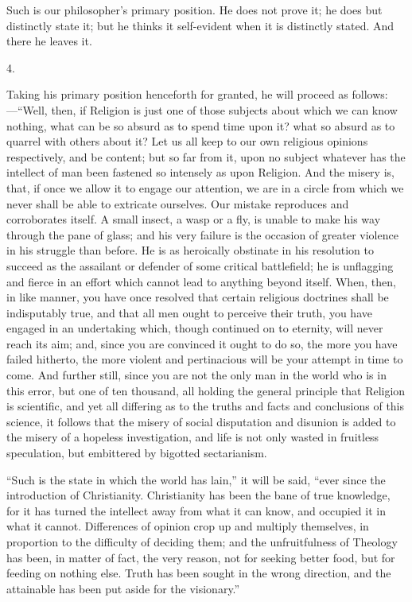 Such is our philosopher's primary position. He does not prove it;
he does but distinctly state it; but he thinks it self-evident when it
is distinctly stated. And there he leaves it.

4.

Taking his primary position henceforth for granted, he will proceed
as follows:—``Well, then, if Religion is just one of those
subjects about which we can know nothing, what can be so absurd as to
spend time upon it? what so absurd as to quarrel with others about it?
Let us all keep to our own religious opinions respectively, and be
content; but so far from it, upon no subject whatever has the
intellect of man been fastened so intensely as upon Religion. And the
misery is, that, if once we allow it to engage our attention, we are
in a circle from which we never shall be able to extricate ourselves. Our mistake reproduces and corroborates itself. A small
insect, a wasp or a fly, is unable to make his way through the pane of
glass; and his very failure is the occasion of greater violence in his
struggle than before. He is as heroically obstinate in his resolution
to succeed as the assailant or defender of some critical battlefield;
he is unflagging and fierce in an effort which cannot lead to anything
beyond itself. When, then, in like manner, you have once resolved that
certain religious doctrines shall be indisputably true, and that all
men ought to perceive their truth, you have engaged in an undertaking
which, though continued on to eternity, will never reach its aim; and,
since you are convinced it ought to do so, the more you have failed
hitherto, the more violent and pertinacious will be your attempt in
time to come. And further still, since you are not the only man in the
world who is in this error, but one of ten thousand, all holding the
general principle that Religion is scientific, and yet all differing
as to the truths and facts and conclusions of this science, it follows
that the misery of social disputation and disunion is added to the
misery of a hopeless investigation, and life is not only wasted in
fruitless speculation, but embittered by bigotted sectarianism.

``Such is the state in which the world has lain,'' it will
be said, ``ever since the introduction of Christianity.
Christianity has been the bane of true knowledge, for it has turned
the intellect away from what it can know, and occupied it in what it
cannot. Differences of opinion crop up and multiply themselves, in
proportion to the difficulty of deciding them; and the unfruitfulness
of Theology has been, in matter of fact, the very reason, not for
seeking better food, but for feeding on nothing else. Truth has been
sought in the wrong direction, and the attainable has been put aside
for the visionary.''

